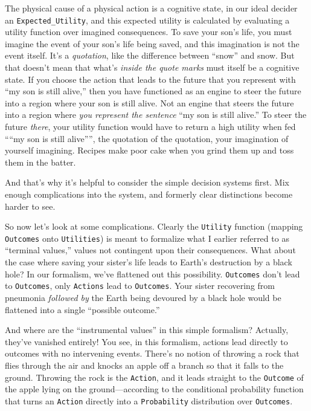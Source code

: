 {{
 The physical cause of a physical action is a cognitive state, in
our ideal decider an \texttt{Expected\_Utility}, and this expected utility is
calculated by evaluating a utility function over imagined consequences.
To save your son's life, you must imagine the event of
your son's life being saved, and this imagination is
not the event itself. It's a \textit{quotation}, like
the difference between ``snow'' and
snow. But that doesn't mean that what's
\textit{inside the quote marks} must itself be a cognitive state. If
you choose the action that leads to the future that you represent with
``my son is still alive,'' then you
have functioned as an engine to steer the future into a region where
your son is still alive. Not an engine that steers the future into a
region where \textit{you represent the sentence} ``my
son is still alive.'' To steer the future
\textit{there}, your utility function would have to return a high
utility when fed ````my son is still
alive'''', the quotation of the
quotation, your imagination of yourself imagining. Recipes make poor
cake when you grind them up and toss them in the batter.}

{
 And that's why it's helpful to
consider the simple decision systems first. Mix enough complications
into the system, and formerly clear distinctions become harder to see.}

{
 So now let's look at some complications. Clearly
the \texttt{Utility} function (mapping \texttt{Outcomes} onto \texttt{Utilities}) is meant to
formalize what I earlier referred to as ``terminal
values,'' values not contingent upon their
consequences. What about the case where saving your
sister's life leads to Earth's
destruction by a black hole? In our formalism, we've
flattened out this possibility. \texttt{Outcomes} don't lead to
\texttt{Outcomes}, only \texttt{Actions} lead to \texttt{Outcomes}. Your sister recovering from
pneumonia \textit{followed by} the Earth being devoured by a black hole
would be flattened into a single ``possible
outcome.''}

{
 And where are the ``instrumental
values'' in this simple formalism? Actually,
they've vanished entirely! You see, in this formalism,
actions lead directly to outcomes with no intervening events.
There's no notion of throwing a rock that flies through
the air and knocks an apple off a branch so that it falls to the
ground. Throwing the rock is the \texttt{Action}, and it leads straight to the
\texttt{Outcome} of the apple lying on the ground---according to the conditional
probability function that turns an \texttt{Action} directly into a \texttt{Probability}
distribution over \texttt{Outcomes}.}

}
